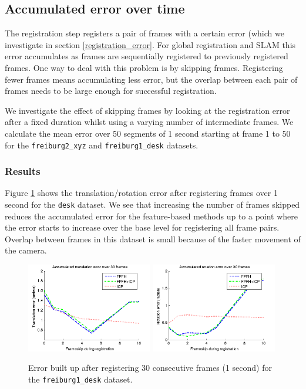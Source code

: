 \documentclass[a4paper]{article}
\begin{document}
\subsection{Accumulated error over time}
\label{accumulated_error}

The registration step registers a pair of frames with a certain error (which we investigate in section \ref{registration_error}. For global registration and \ac{SLAM} this error accumulates as frames are sequentially registered to previously registered frames. One way to deal with this problem is by skipping frames. Registering fewer frames means accumulating less error, but the overlap between each pair of frames needs to be large enough for successful registration. 

We investigate the effect of skipping frames by looking at the registration error after a fixed duration whilst using a varying number of intermediate frames. We calculate the mean error over 50 segments of 1 second starting at frame 1 to 50 for the \texttt{freiburg2\_xyz} and \texttt{freiburg1\_desk} datasets.

\subsubsection{Results}

Figure \ref{fig:accumulated_error} shows the translation/rotation error after registering frames over 1 second for the \texttt{desk} dataset. We see that increasing the number of frames skipped reduces the accumulated error for the feature-based methods up to a point where the error starts to increase over the base level for registering all frame pairs. Overlap between frames in this dataset is small because of the faster movement of the camera. 

\begin{figure}[htbp]
    \centering
        \includegraphics[width=0.49\textwidth]{ims/deskAccumulatedtranslationerrorover30frames.png}
        \includegraphics[width=0.49\textwidth]{ims/deskAccumulatedrotationerrorover30frames.png}
    \caption{Error built up after registering 30 consecutive frames (1 second) for the \texttt{freiburg1\_desk} dataset.}
    \label{fig:accumulated_error}
\end{figure}
\end{document}
